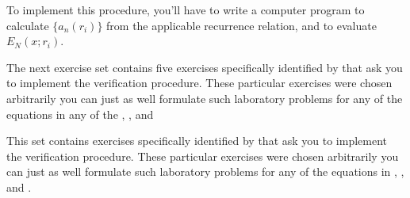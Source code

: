 To implement this procedure, you'll have to write a computer program to
calculate $\{a_n(r_i)\}$ from the applicable recurrence relation, and
to evaluate $E_N(x;r_i)$.

The next exercise set contains five exercises specifically
identified by \Lex that ask you to implement the verification
procedure. These particular exercises were chosen arbitrarily   you can
just as well formulate such laboratory problems for any of the
equations in any  of the ,
, and 



\exercises
This set contains exercises specifically
identified by \Lex that ask you to implement the verification
procedure. These particular exercises were chosen arbitrarily   you can
just as well formulate such laboratory problems for any of the
equations in ,
, and .


